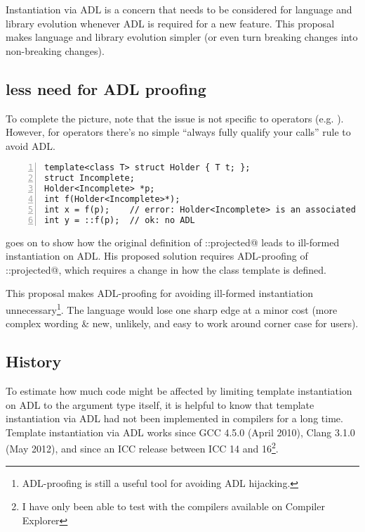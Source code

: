 Instantiation via ADL is a concern that needs to be considered for language and library 
evolution whenever ADL is required for a new feature.
This proposal makes language and library evolution simpler (or even turn breaking changes 
into non-breaking changes).

\subsection{less need for ADL proofing}

To complete the picture, note that the issue is not specific to operators (e.g. 
). However, for operators there's no simple “always fully qualify your 
calls” rule to avoid ADL.
\begin{lstlisting}[style=Vc,numbers=left,float={hbtp},label=lst:example2,caption={
Minimal example triggering ill-formed instantiation, as presented in \cite{P2538R0}
}]
template<class T> struct Holder { T t; };
struct Incomplete;
Holder<Incomplete> *p;
int f(Holder<Incomplete>*);
int x = f(p);    // error: Holder<Incomplete> is an associated entity
int y = ::f(p);  // ok: no ADL
\end{lstlisting}

\textcite{P2538R0} goes on to show how the original definition of \codelst@std::projected@ 
leads to ill-formed instantiation on ADL. His proposed solution requires ADL-proofing of 
\codelst@std::projected@, which requires a change in how the class template is defined.

This proposal makes ADL-proofing for avoiding ill-formed instantiation 
unnecessary\footnote{ADL-proofing is still a useful tool for avoiding ADL hijacking.}. The 
language would lose one sharp edge at a minor cost (more complex wording \& new, unlikely, 
and easy to work around corner case for users).

\subsection{History}

To estimate how much code might be affected by limiting template instantiation on ADL to 
the argument type itself, it is helpful to know that template instantiation via ADL had 
not been implemented in compilers for a long time. Template instantiation via ADL works 
since GCC 4.5.0 (April 2010), Clang 3.1.0 (May 2012), and since an ICC release between ICC 
14 and 16\footnote{I have only been able to test with the compilers available on Compiler 
Explorer}.

